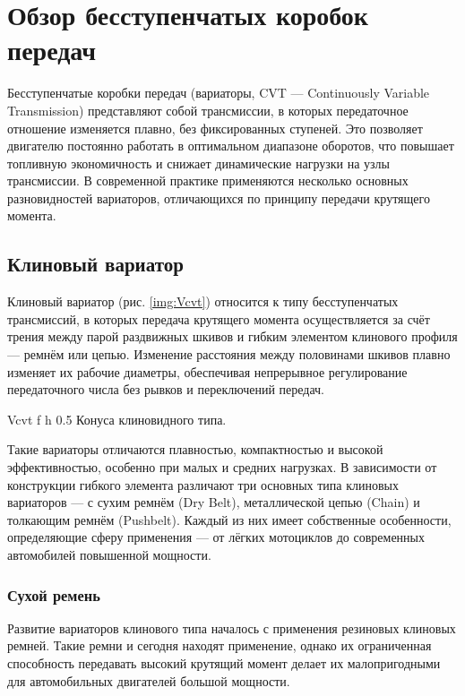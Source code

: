 \chapter{Обзор бесступенчатых коробок передач}

Бесступенчатые коробки передач (вариаторы, CVT — Continuously Variable Transmission) представляют собой трансмиссии, в которых передаточное отношение изменяется плавно, без фиксированных ступеней. Это позволяет двигателю постоянно работать в оптимальном диапазоне оборотов, что повышает топливную экономичность и снижает динамические нагрузки на узлы трансмиссии. В современной практике применяются несколько основных разновидностей вариаторов, отличающихся по принципу передачи крутящего момента.

\section{Клиновый вариатор}

Клиновый вариатор (рис. \ref{img:Vcvt}) относится к типу бесступенчатых трансмиссий, в которых передача крутящего момента осуществляется за счёт трения между парой раздвижных шкивов и гибким элементом клинового профиля — ремнём или цепью. Изменение расстояния между половинами шкивов плавно изменяет их рабочие диаметры, обеспечивая непрерывное регулирование передаточного числа без рывков и переключений передач.

    {Vcvt} %
    {f} %
    {h} %
    {0.5\textwidth} %
    {Конуса клиновидного типа.} %

Такие вариаторы отличаются плавностью, компактностью и высокой эффективностью, особенно при малых и средних нагрузках. В зависимости от конструкции гибкого элемента различают три основных типа клиновых вариаторов — с сухим ремнём (Dry Belt), металлической цепью (Chain) и толкающим ремнём (Pushbelt). Каждый из них имеет собственные особенности, определяющие сферу применения — от лёгких мотоциклов до современных автомобилей повышенной мощности.

\subsection{Сухой ремень}

Развитие вариаторов клинового типа началось с применения резиновых клиновых ремней. Такие ремни и сегодня находят применение, однако их ограниченная способность передавать высокий крутящий момент делает их малопригодными для автомобильных двигателей большой мощности.

